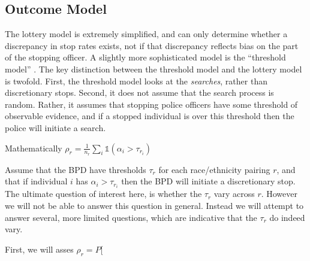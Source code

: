 \documentclass[11pt]{article}
\newcommand{\ic}{\textit}
\begin{document}
\subsection{Outcome Model}
The lottery model is extremely simplified, and can only determine whether a discrepancy in stop rates exists, not if that discrepancy reflects bias on the part of the stopping officer. A slightly more sophisticated model is the ``threshold model'' \citep{simoiu_problem_2017}. The key distinction between the threshold model and the lottery model is twofold. First, the threshold model looks at the \ic{searches}, rather than discretionary stops. Second, it does not assume that the search process is random. Rather, it assumes that stopping police officers have some threshold of observable evidence, and if a stopped individual is over this threshold then the police will initiate a search.

Mathematically 
$\rho_r = \frac{1}{n_r} \sum_i \mathbb{1}(\alpha_i > \tau_{r_i}) $

Assume that the BPD have thresholds $\tau_r$ for each race/ethnicity pairing $r$, and that if individual $i$ has $\alpha_i > \tau_{r_i}$ then the BPD will initiate a discretionary stop. The ultimate question of interest here, is whether the $\tau_r$ vary across $r$. However we will not be able to answer this question in general. Instead we will attempt to answer several, more limited questions, which are indicative that the $\tau_r$ do indeed vary.

\cite{}

First, we will asses $\rho_r = P[$


\end{document}

